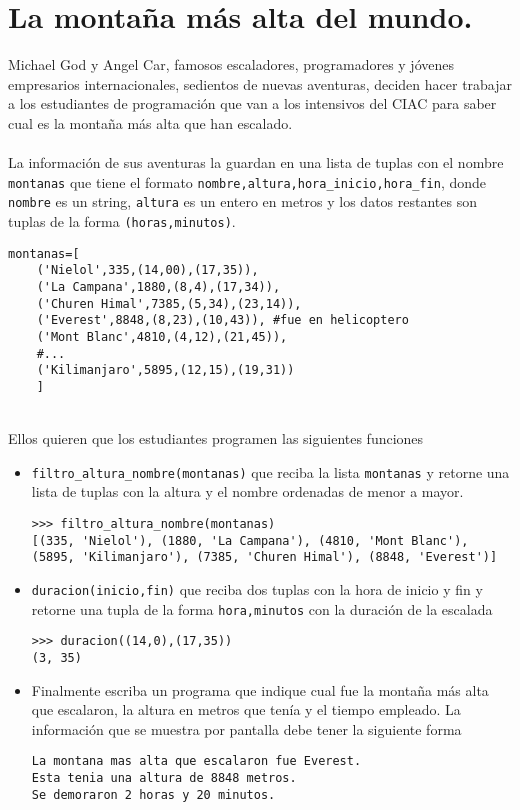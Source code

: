 \section{La montaña más alta del mundo.}

Michael God y Angel Car, famosos escaladores, programadores y jóvenes empresarios internacionales, sedientos de nuevas aventuras, deciden hacer trabajar a los estudiantes de programación que van a los intensivos del CIAC para saber cual es la montaña más alta que han escalado.
\\ \\
La información de sus aventuras la guardan en una lista de tuplas con el nombre \texttt{montanas} que tiene el formato \texttt{nombre,altura,hora\_inicio,hora\_fin}, donde \texttt{nombre} es un string, \texttt{altura} es un entero en metros y los datos restantes son tuplas de la forma \texttt{(horas,minutos)}.
\\
\begin{lstlisting}[style=consola]
montanas=[
    ('Nielol',335,(14,00),(17,35)),
    ('La Campana',1880,(8,4),(17,34)),
    ('Churen Himal',7385,(5,34),(23,14)),
    ('Everest',8848,(8,23),(10,43)), #fue en helicoptero
    ('Mont Blanc',4810,(4,12),(21,45)),
    #...
    ('Kilimanjaro',5895,(12,15),(19,31))
    ]

\end{lstlisting}
\\
Ellos quieren que los estudiantes programen las siguientes funciones

\begin{itemize}
    \item \texttt{filtro\_altura\_nombre(montanas)} que reciba la lista \texttt{montanas} y retorne una lista de tuplas con la altura y el nombre ordenadas de menor a mayor.
    \\
    \begin{lstlisting}[style=consola]
>>> filtro_altura_nombre(montanas)
[(335, 'Nielol'), (1880, 'La Campana'), (4810, 'Mont Blanc'), 
(5895, 'Kilimanjaro'), (7385, 'Churen Himal'), (8848, 'Everest')]
    \end{lstlisting}

    \item \texttt{duracion(inicio,fin)} que reciba dos tuplas con la hora de inicio y fin y retorne una tupla de la forma \texttt{hora,minutos} con la duración de la escalada
    \\
    \begin{lstlisting}[style=consola]
>>> duracion((14,0),(17,35))
(3, 35)
    \end{lstlisting}
    \item Finalmente escriba un programa que indique cual fue la montaña más alta que escalaron, la altura en metros que tenía y el tiempo empleado. La información que se muestra por pantalla debe tener la siguiente forma
    \begin{lstlisting}[style=consola]
La montana mas alta que escalaron fue Everest.
Esta tenia una altura de 8848 metros.
Se demoraron 2 horas y 20 minutos.
    \end{lstlisting}
    
\end{itemize}